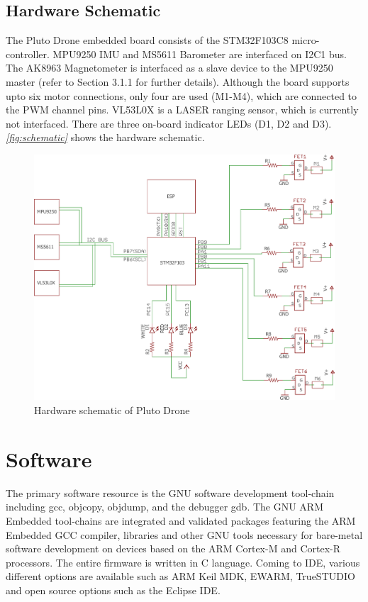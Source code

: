 \documentclass[a4paper,12pt,oneside]{book}
\begin{document}
\section{Hardware Schematic}
The Pluto Drone embedded board consists of the STM32F103C8 micro-controller. MPU9250 IMU and MS5611 Barometer are interfaced on I2C1 bus. The AK8963 Magnetometer is interfaced as a slave device to the MPU9250 master (refer to Section 3.1.1 for further details). Although the board supports upto six motor connections, only four are used (M1-M4), which are connected to the PWM channel pins. VL53L0X is a LASER ranging sensor, which is currently not interfaced. There are three on-board indicator LEDs (D1, D2 and D3). \textit{\autoref{fig:schematic}} shows the hardware schematic.

\begin{figure}[!htb]
\centering
\includegraphics[width=\textwidth]{images/pluto_drone_schematic}
\caption{Hardware schematic of Pluto Drone}
\label{fig:schematic}
\end{figure}

\chapter[Software]{Software}
The primary software resource is the GNU software development tool-chain including gcc, objcopy, objdump, and the debugger gdb. The GNU ARM Embedded tool-chains are integrated and validated packages featuring the ARM Embedded GCC compiler, libraries and other GNU tools necessary for bare-metal software development on devices based on the ARM Cortex-M and Cortex-R processors.\cite{geob, gnu} The entire firmware is written in C language. Coming to IDE, various different options are available such as ARM Keil MDK, EWARM, TrueSTUDIO and open source options such as the Eclipse IDE.
\end{document}
